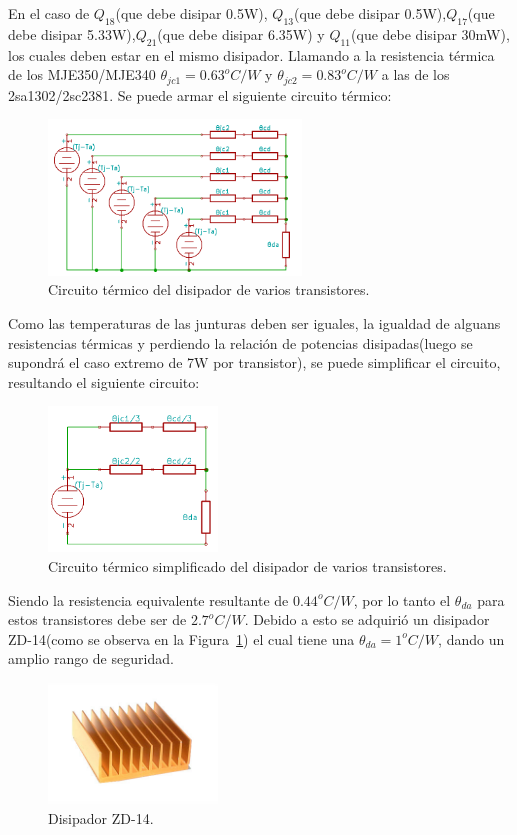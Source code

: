 En el caso de $Q_{18}$(que debe disipar 0.5W), $Q_{13}$(que debe disipar 0.5W),$Q_{17}$(que debe disipar 5.33W),$Q_{21}$(que debe disipar 6.35W) y $Q_{11}$(que debe disipar 30mW), los cuales deben estar en el mismo disipador.
Llamando a la resistencia térmica de los MJE350/MJE340 $\theta_{jc1}=0.63^oC/W$ y $\theta_{jc2}=0.83^oC/W$ a las de los 2sa1302/2sc2381. Se puede armar el siguiente circuito térmico:

\begin{figure}[H]
\centerline{
\includegraphics[width=0.6\textwidth]{img/disipador_cir.png}}
\caption{Circuito térmico del disipador de varios transistores.}
\end{figure}

Como las temperaturas de las junturas deben ser iguales, la igualdad de alguans resistencias térmicas y perdiendo la relación de potencias disipadas(luego se supondrá el caso extremo de 7W por transistor), se puede simplificar el circuito, resultando el siguiente circuito:

\begin{figure}[H]
\centerline{
\includegraphics[width=0.4\textwidth]{img/disipador_cir2.png}}
\caption{Circuito térmico simplificado del disipador de varios transistores.}
\end{figure}

Siendo la resistencia equivalente resultante de $0.44^oC/W$, por lo tanto el $\theta_{da}$ para estos transistores debe ser de $2.7^oC/W$. Debido a esto se adquirió un disipador ZD-14(como se observa en la Figura~\ref{zd14}) el cual tiene una $\theta_{da}=1^oC/W$, dando un amplio rango de seguridad.
\begin{figure}[H]
\centerline{
\includegraphics[width=0.4\textwidth]{img/zd-14.jpg}}
\caption{Disipador ZD-14.}
\label{zd14} 
\end{figure}


